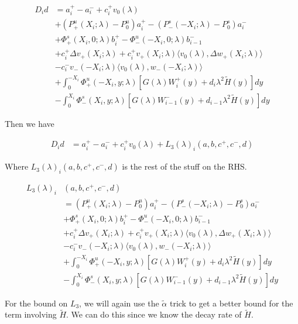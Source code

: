 \documentclass[12pt]{article}
\begin{document}
\begin{enumerate}
\begin{align*}
D_i d &= a_i^+ - a_i^- + c_i^+ v_0(\lambda) \\
&+ (P^u_+(X_i; \lambda) - P_0^u)a_i^+ - (P^s_-(-X_i; \lambda) - P_0^s)a_i^- \\
&+ \Phi^s_+(X_i, 0; \lambda)b_i^+ - \Phi^u_-(-X_i, 0; \lambda)b_{i-1}^- \\
&+ c_i^+ \Delta v_+(X_i; \lambda) + c_i^+ v_+(X_i; \lambda) \langle v_0(\lambda), \Delta w_+(X_i; \lambda) \rangle \\
&- c_i^- v_-(-X_i; \lambda) \langle v_0(\lambda), w_-(-X_i; \lambda) \rangle \\
&+ \int_0^{-X_i} \Phi^u_+(-X_i, y; \lambda) [ G(\lambda)W_i^+(y) + d_i \lambda^2 \tilde{H}(y) ] dy \\
&- \int_0^{X_i} \Phi^s_-(X_i, y; \lambda) [ G(\lambda)W_{i-1}^-(y) + d_{i-1} \lambda^2 \tilde{H}(y) ] dy
\end{align*}

Then we have 

\begin{align*}
D_i d &= a_i^+ - a_i^- + c_i^+ v_0(\lambda) + L_3(\lambda)_i(a, b, c^+, c^-, d)
\end{align*}

Where $L_3(\lambda)_i(a, b, c^+, c^-, d)$ is the rest of the stuff on the RHS.

\begin{align*}
L_3(\lambda)_i&(a, b, c^+, c^-, d) \\ 
&= (P^u_+(X_i; \lambda) - P_0^u)a_i^+ - (P^s_-(-X_i; \lambda) - P_0^s)a_i^- \\
&+ \Phi^s_+(X_i, 0; \lambda)b_i^+ - \Phi^u_-(-X_i, 0; \lambda)b_{i-1}^- \\
&+ c_i^+ \Delta v_+(X_i; \lambda) + c_i^+ v_+(X_i; \lambda) \langle v_0(\lambda), \Delta w_+(X_i; \lambda) \rangle \\
&- c_i^- v_-(-X_i; \lambda) \langle v_0(\lambda), w_-(-X_i; \lambda) \rangle \\
&+ \int_0^{-X_i} \Phi^u_+(-X_i, y; \lambda) [ G(\lambda)W_i^+(y) + d_i \lambda^2 \tilde{H}(y) ] dy \\
&- \int_0^{X_i} \Phi^s_-(X_i, y; \lambda) [ G(\lambda)W_{i-1}^-(y) + d_{i-1} \lambda^2 \tilde{H}(y) ] dy
\end{align*}

For the bound on $L_3$, we will again use the $\tilde{\alpha}$ trick to get a better bound for the term involving $\tilde{H}$. We can do this since we know the decay rate of $\tilde{H}$.


\end{enumerate}
\end{document}
